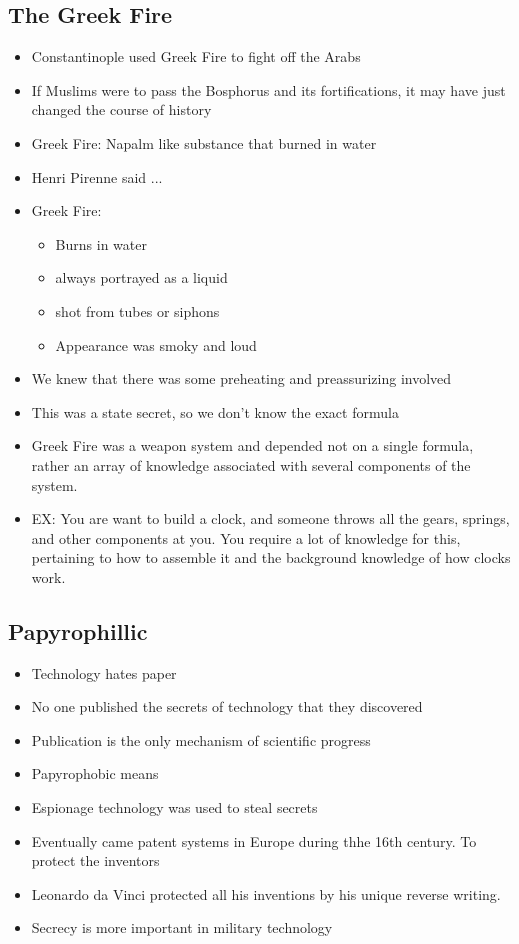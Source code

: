 \documentclass{article}
\begin{document}
\subsection{The Greek Fire}
\begin{itemize}
  \item Constantinople used Greek Fire to fight off the Arabs
  \item If Muslims were to pass the Bosphorus and its fortifications,
    it may have just changed the course of history
  \item Greek Fire: Napalm like substance that burned in water
  \item Henri Pirenne said ...
  \item Greek Fire:
    \begin{itemize}
      \item Burns in water
      \item always portrayed as a liquid
      \item shot from tubes or siphons
      \item Appearance was smoky and loud
    \end{itemize}
  \item We knew that there was some preheating and preassurizing involved
  \item This was a state secret, so we don't know the exact formula
  \item Greek Fire was a weapon system and depended not on a single formula,
    rather an array of knowledge associated with several
    components of the system.
  \item EX: You are want to build a clock, and someone throws all the
    gears, springs, and other components at you. You require a lot of knowledge for this, pertaining
    to how to assemble it and the background knowledge of how clocks work.
\end{itemize}

\subsection{Papyrophillic}
\begin{itemize}
  \item Technology hates paper
  \item No one published the secrets of technology
    that they discovered
  \item Publication is the only mechanism of scientific progress
  \item Papyrophobic means
  \item Espionage technology was used to steal secrets
  \item Eventually came patent systems
    in Europe during thhe 16th century.
    To protect the inventors
  \item Leonardo da Vinci protected all his inventions
    by his unique reverse writing.
  \item Secrecy is more important in military technology
\end{itemize}
\end{document}
